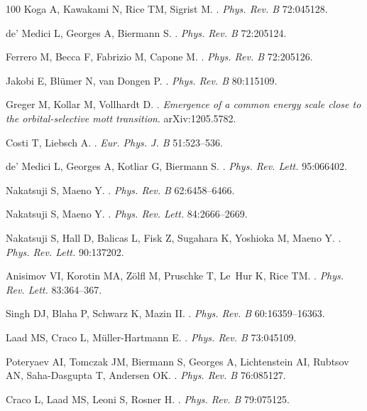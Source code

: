 \documentclass[]{ar2e-changed}%
\begin{document}
\begin{thebibliography}{100}
Koga A, Kawakami N, Rice TM, Sigrist M.
.
\newblock \emph{Phys. Rev. B} 72:045128.

de' Medici L, Georges A, Biermann S.
.
\newblock \emph{Phys. Rev. B} 72:205124.

Ferrero M, Becca F, Fabrizio M, Capone M.
.
\newblock \emph{Phys. Rev. B} 72:205126.

Jakobi E, Bl\"umer N, van Dongen P.
.
\newblock \emph{Phys. Rev. B} 80:115109.

Greger M, Kollar M, Vollhardt D.
.
\newblock \emph{Emergence of a common energy scale close to the
  orbital-selective mott transition}.
\newblock arXiv:1205.5782.

Costi T, Liebsch A.
.
\newblock \emph{Eur. Phys. J. B} 51:523--536.

de' Medici L, Georges A, Kotliar G, Biermann S.
.
\newblock \emph{Phys. Rev. Lett.} 95:066402.

Nakatsuji S, Maeno Y.
.
\newblock \emph{Phys. Rev. B} 62:6458--6466.

Nakatsuji S, Maeno Y.
.
\newblock \emph{Phys. Rev. Lett.} 84:2666--2669.

Nakatsuji S, Hall D, Balicas L, Fisk Z, Sugahara K, Yoshioka M, Maeno Y.
.
\newblock \emph{Phys. Rev. Lett.} 90:137202.

Anisimov VI, Korotin MA, Z\"olfl M, Pruschke T, Le~Hur K, Rice TM.
.
\newblock \emph{Phys. Rev. Lett.} 83:364--367.

Singh DJ, Blaha P, Schwarz K, Mazin II.
.
\newblock \emph{Phys. Rev. B} 60:16359--16363.

Laad MS, Craco L, M\"uller-Hartmann E.
.
\newblock \emph{Phys. Rev. B} 73:045109.

Poteryaev AI, Tomczak JM, Biermann S, Georges A, Lichtenstein AI, Rubtsov AN,
  Saha-Dasgupta T, Andersen OK.
.
\newblock \emph{Phys. Rev. B} 76:085127.

Craco L, Laad MS, Leoni S, Rosner H.
.
\newblock \emph{Phys. Rev. B} 79:075125.


\end{thebibliography}
\end{document}
